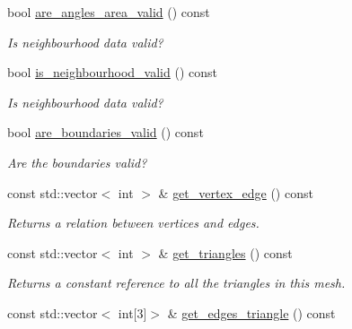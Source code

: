 \begin{DoxyCompactItemize}
\mbox{\label{classgeoproc_1_1TriangleMesh_ad25eb7051e7eac604142d45929f33c19}} 
bool \hyperlink{classgeoproc_1_1TriangleMesh_ad25eb7051e7eac604142d45929f33c19}{are\+\_\+angles\+\_\+area\+\_\+valid} () const
\begin{DoxyCompactList}\small\item\em Is neighbourhood data valid? \end{DoxyCompactList}\item 
\mbox{\label{classgeoproc_1_1TriangleMesh_aa6f95b95709a72a14a15638bfeeed3f9}} 
bool \hyperlink{classgeoproc_1_1TriangleMesh_aa6f95b95709a72a14a15638bfeeed3f9}{is\+\_\+neighbourhood\+\_\+valid} () const
\begin{DoxyCompactList}\small\item\em Is neighbourhood data valid? \end{DoxyCompactList}\item 
\mbox{\label{classgeoproc_1_1TriangleMesh_a409e399857e1a1abc9f23918ff5f5860}} 
bool \hyperlink{classgeoproc_1_1TriangleMesh_a409e399857e1a1abc9f23918ff5f5860}{are\+\_\+boundaries\+\_\+valid} () const
\begin{DoxyCompactList}\small\item\em Are the boundaries valid? \end{DoxyCompactList}\item 
const std\+::vector$<$ int $>$ \& \hyperlink{classgeoproc_1_1TriangleMesh_ae73a760e61250eb2f474b8ab03a1e2ab}{get\+\_\+vertex\+\_\+edge} () const
\begin{DoxyCompactList}\small\item\em Returns a relation between vertices and edges. \end{DoxyCompactList}\item 
const std\+::vector$<$ int $>$ \& \hyperlink{classgeoproc_1_1TriangleMesh_af5093cb9508a1f3193f5b8481bbabef3}{get\+\_\+triangles} () const
\begin{DoxyCompactList}\small\item\em Returns a constant reference to all the triangles in this mesh. \end{DoxyCompactList}\item 
const std\+::vector$<$ int\mbox{[}3\mbox{]}$>$ \& \hyperlink{classgeoproc_1_1TriangleMesh_af56b3521a8df241f4f67c7f2bbacfa51}{get\+\_\+edges\+\_\+triangle} () const

\end{DoxyCompactItemize}
